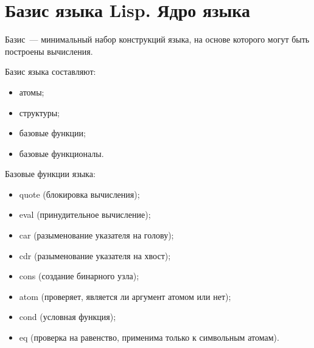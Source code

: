 \section{Базис языка Lisp. Ядро языка}

Базис~--- минимальный набор конструкций языка, на основе которого могут быть построены вычисления.

Базис языка составляют:
\begin{itemize}
	\item атомы;
	\item структуры;
	\item базовые функции;
	\item базовые функционалы.
\end{itemize}

Базовые функции языка:
\begin{itemize}
	\item quote (блокировка вычисления);
	\item eval (принудительное вычисление);
	\item car (разыменование указателя на голову);
	\item cdr (разыменование указателя на хвост);
	\item cons (создание бинарного узла);
	\item atom (проверяет, является ли аргумент атомом или нет);
	\item cond (условная функция);
	\item eq (проверка на равенство, применима только к символьным атомам).
\end{itemize}

\clearpage
